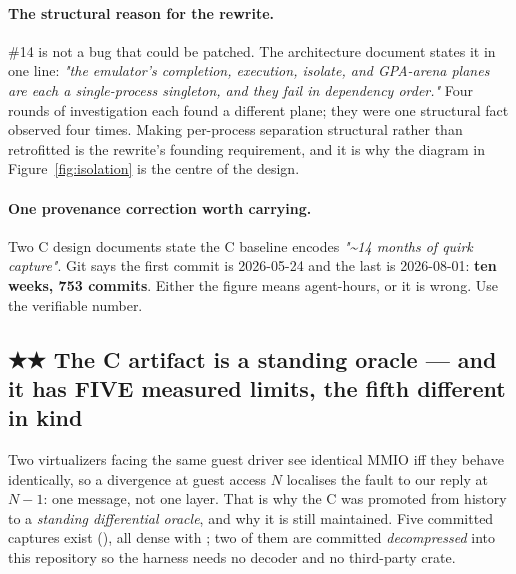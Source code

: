\documentclass[10.5pt]{article}
\begin{document}
\paragraph{The structural reason for the rewrite.} \#14 is not a bug that could be patched. The
architecture document states it in one line: \emph{"the emulator's completion, execution,
isolate, and GPA-arena planes are each a single-process singleton, and they fail in dependency
order."} Four rounds of investigation each found a different plane; they were one structural
fact observed four times. Making per-process separation structural rather than retrofitted is
the rewrite's founding requirement, and it is why the diagram in
Figure~\ref{fig:isolation} is the centre of the design.

\paragraph{One provenance correction worth carrying.} Two C design documents state the C
baseline encodes \emph{"\textasciitilde14 months of quirk capture"}. Git says the first commit is
2026-05-24 and the last is 2026-08-01: \textbf{ten weeks, 753 commits}. Either the figure means
agent-hours, or it is wrong. Use the verifiable number.

\subsection{\texorpdfstring{★★ The C artifact is a standing oracle --- and it has FIVE measured limits, the fifth different in kind}{The C artifact is a standing oracle --- and it has FIVE measured limits}}
\label{sec:oraclelimits}

Two virtualizers facing the same guest driver see identical MMIO iff they behave identically, so
a divergence at guest access $N$ localises the fault to our reply at $N-1$: one message, not one
layer. That is why the C was promoted from history to a \emph{standing differential oracle}, and
why it is still maintained. Five committed captures exist
(), all dense with ; two of them are
committed \emph{decompressed} into this repository so the harness needs no decoder and no
third-party crate.
\end{document}
